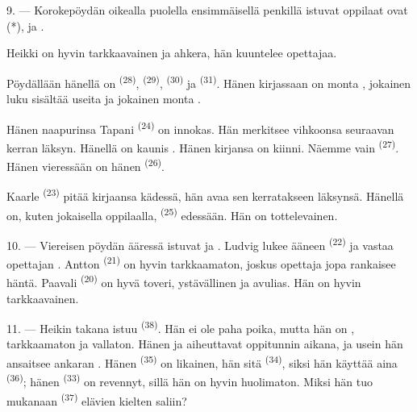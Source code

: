 \VUsaut{2.4mm}

\VUsaut{3.0mm}

9. --- Korokepöydän oikealla puolella ensimmäisellä penkillä istuvat oppilaat
ovat  (*),  ja .

Heikki on hyvin tarkkaavainen ja ahkera, hän kuuntelee opettajaa.

Pöydällään hänellä on  \textsuperscript{(28)}, 
\textsuperscript{(29)},  \textsuperscript{(30)} ja
 \textsuperscript{(31)}. Hänen kirjassaan on monta
, jokainen luku sisältää useita  ja jokainen
 monta .

Hänen naapurinsa Tapani \textsuperscript{(24)} on innokas. Hän merkitsee
vihkoonsa seuraavan kerran läksyn. Hänellä on kaunis . Hänen
kirjansa on kiinni. Näemme vain  \textsuperscript{(27)}. Hänen
vieressään on hänen  \textsuperscript{(26)}.

Kaarle \textsuperscript{(23)} pitää kirjaansa kädessä, hän avaa sen
kerratakseen läksynsä. Hänellä on, kuten jokaisella oppilaalla,
 \textsuperscript{(25)} edessään. Hän on tottelevainen.

10. --- Viereisen pöydän ääressä istuvat  ja
. Ludvig lukee ääneen  \textsuperscript{(22)}
ja vastaa opettajan . Antton \textsuperscript{(21)} on
hyvin tarkkaamaton, joskus opettaja jopa rankaisee häntä. Paavali
\textsuperscript{(20)} on hyvä toveri, ystävällinen ja avulias. Hän on hyvin
tarkkaavainen.

\VUsaut{4.2mm}
\VUsaut{3.2mm}

11. --- Heikin takana istuu  \textsuperscript{(38)}. Hän ei ole
paha poika, mutta hän on , tarkkaamaton ja vallaton. Hänen
 ja  aiheuttavat
 oppitunnin aikana, ja usein hän ansaitsee ankaran
. Hänen  \textsuperscript{(35)} on
likainen, hän  sitä  
\textsuperscript{(34)}, siksi hän käyttää aina 
\textsuperscript{(36)}; hänen  \textsuperscript{(33)} on
revennyt, sillä hän on hyvin huolimaton. Miksi hän tuo mukanaan
 \textsuperscript{(37)} elävien kielten saliin?


